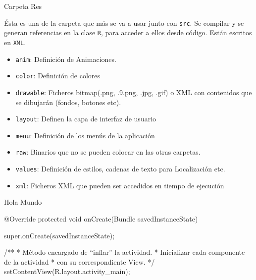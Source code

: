 \documentclass{beamer}
\begin{document}
\begin{frame}{Carpeta Res}
\begin{block}{}
Ésta es una de la carpeta que más se va a usar junto con \texttt{src}. Se compilar y se generan referencias en la clase \texttt{R}, para acceder a ellos desde código. Están escritos en \texttt{XML}.
\pause
\end{block}
\begin{itemize}
    \item<2-> \texttt{anim}: Definición de Animaciones.
    \item<3-> \texttt{color}: Definición de colores
    \item<4-> \texttt{drawable}: Ficheros bitmap(.png, .9.png, .jpg, .gif) o XML con contenidos que se dibujarán (fondos, botones etc).
    \item<5-> \texttt{layout}: Definen la capa de interfaz de usuario
    \item<6-> \texttt{menu}: Definición de los menús de la aplicación
    \item<7-> \texttt{raw}: Binarios que no se pueden colocar en las otras carpetas.
    \item<8-> \texttt{values}: Definición de estilos, cadenas de texto para Localización etc.
    \item<9-> \texttt{xml}: Ficheros XML que pueden ser accedidos en tiempo de ejecución
\end{itemize}
\end{frame}

\begin{frame}[fragile]{Hola Mundo}
\begin{block}{}
\begin{javacode}
    @Override
    protected void onCreate(Bundle savedInstanceState) {
        super.onCreate(savedInstanceState);

        /**
         * Método encargado de “inflar” la actividad.
         * Inicializar cada componente de la actividad
         * con su correspondiente View.
         */
        setContentView(R.layout.activity_main);
    }
\end{javacode}
\end{block}
\end{frame}
\end{document}
